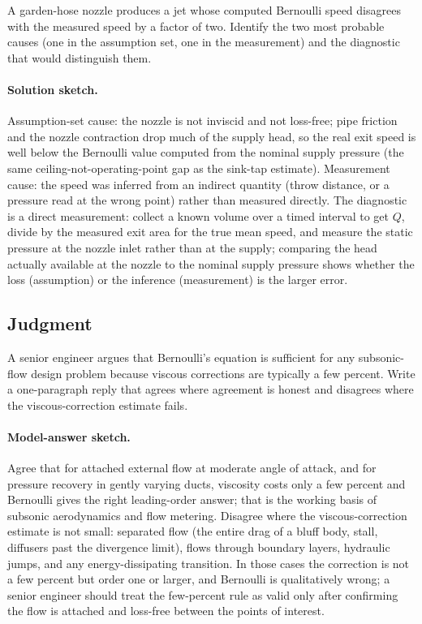 \begin{exercise}
A garden-hose nozzle produces a jet whose computed Bernoulli speed
disagrees with the measured speed by a factor of two. Identify the
two most probable causes (one in the assumption set, one in the
measurement) and the diagnostic that would distinguish them.

\paragraph{Solution sketch.} Assumption-set cause: the nozzle is not
inviscid and not loss-free; pipe friction and the nozzle contraction
drop much of the supply head, so the real exit speed is well below the
Bernoulli value computed from the nominal supply pressure (the same
ceiling-not-operating-point gap as the sink-tap estimate). Measurement
cause: the speed was inferred from an indirect quantity (throw
distance, or a pressure read at the wrong point) rather than measured
directly. The diagnostic is a direct measurement: collect a known
volume over a timed interval to get $Q$, divide by the measured exit
area for the true mean speed, and measure the static pressure at the
nozzle inlet rather than at the supply; comparing the head actually
available at the nozzle to the nominal supply pressure shows whether
the loss (assumption) or the inference (measurement) is the larger
error.
\end{exercise}

\subsection*{Judgment}

\begin{exercise}
A senior engineer argues that Bernoulli's equation is sufficient
for any subsonic-flow design problem because viscous corrections
are typically a few percent. Write a one-paragraph reply that
agrees where agreement is honest and disagrees where the
viscous-correction estimate fails.

\paragraph{Model-answer sketch.} Agree that for attached external
flow at moderate angle of attack, and for pressure recovery in
gently varying ducts, viscosity costs only a few percent and Bernoulli
gives the right leading-order answer; that is the working basis of
subsonic aerodynamics and flow metering. Disagree where the
viscous-correction estimate is not small: separated flow (the entire
drag of a bluff body, stall, diffusers past the divergence limit),
flows through boundary layers, hydraulic jumps, and any
energy-dissipating transition. In those cases the correction is not a
few percent but order one or larger, and Bernoulli is qualitatively
wrong; a senior engineer should treat the few-percent rule as valid
only after confirming the flow is attached and loss-free between the
points of interest.
\end{exercise}

